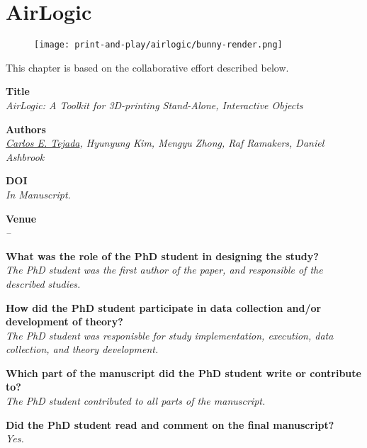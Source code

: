 \chapter{AirLogic} \label{ch:airlogic}
  \begin{figure}[h]
    \centering
    \texttt{[image: print-and-play/airlogic/bunny-render.png]}
  \end{figure}

  \newpage

  This chapter is based on the collaborative effort described below.

  \vfill

  \noindent
  \textbf{Title}\\
  \textit{AirLogic: A Toolkit for 3D-printing Stand-Alone, Interactive Objects}

  \bigskip

  \noindent
  \textbf{Authors}\\
  \textit{\underline{Carlos E. Tejada}, Hyunyung Kim, Mengyu Zhong, Raf Ramakers, Daniel Ashbrook}

  \bigskip

  \noindent
  \textbf{DOI}\\
  \textit{In Manuscript.}

  \bigskip

  \noindent
  \textbf{Venue}\\
  \textit{--}

  \bigskip

  \noindent
  \textbf{What was the role of the PhD student in designing the study?}\\
  \textit{The PhD student was the first author of the paper, and responsible
    of the described studies.}

  \bigskip

  \noindent
  \textbf{How did the PhD student participate in data collection and/or development of theory?}\\
  \textit{The PhD student was responisble for study implementation, execution,
    data collection, and theory development.}

  \bigskip

  \noindent
  \textbf{Which part of the manuscript did the PhD student write or contribute to?}\\
  \textit{The PhD student contributed to all parts of the manuscript.}

  \bigskip

  \noindent
  \textbf{Did the PhD student read and comment on the final manuscript?}\\
  \textit{Yes.}


